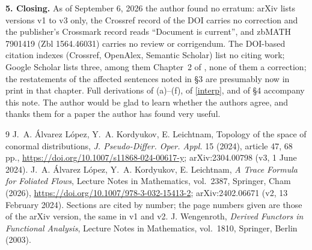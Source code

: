 \documentclass[11pt]{article}
\begin{document}
\medskip\noindent\textbf{5. Closing.}
As of September 6, 2026 the author found no erratum: arXiv lists versions v1 to v3 only, the Crossref record of the DOI carries no correction and the publisher's Crossmark record reads ``Document is current'', and zbMATH 7901419 (Zbl 1564.46031) carries no review or corrigendum. The DOI-based citation indexes (Crossref, OpenAlex, Semantic Scholar) list no citing work; Google Scholar lists three, among them Chapter~2 of \cite{ALKL24m}, none of them a correction; the restatements of the affected sentences noted in \S3 are presumably now in print in that chapter. Full derivations of (a)--(f), of \eqref{interp}, and of \S4 accompany this note. The author would be glad to learn whether the authors agree, and thanks them for a paper the author has found very useful.

\vspace{-1em}
\begin{thebibliography}{9}\setlength{\itemsep}{0pt}\footnotesize
{} J.~A. \'Alvarez L\'opez, Y.~A. Kordyukov, E. Leichtnam, Topology of the space of conormal distributions, \emph{J. Pseudo-Differ. Oper. Appl.} 15 (2024), article 47, 68 pp., \url{https://doi.org/10.1007/s11868-024-00617-y}; arXiv:2304.00798 (v3, 1 June 2024).
 J.~A. \'Alvarez L\'opez, Y.~A. Kordyukov, E. Leichtnam, \emph{A Trace Formula for Foliated Flows}, Lecture Notes in Mathematics, vol.~2387, Springer, Cham (2026), \url{https://doi.org/10.1007/978-3-032-15413-2}; arXiv:2402.06671 (v2, 13 February 2024). Sections are cited by number; the page numbers given are those of the arXiv version, the same in v1 and v2.
 J. Wengenroth, \emph{Derived Functors in Functional Analysis}, Lecture Notes in Mathematics, vol.~1810, Springer, Berlin (2003).
\end{thebibliography}
\end{document}
